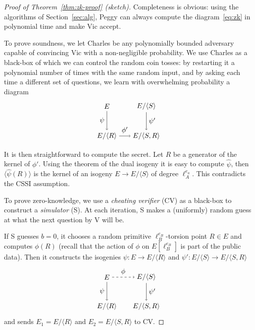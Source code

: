 \documentclass[jmc]{degruyter-journal-a}
\theoremstyle{definition}
\newcommand{\cyc}[1]{{\langle #1 \rangle}}
\begin{document}
\begin{proof}[Proof of Theorem~\ref{thm:zk-proof} (sketch)]
  Completeness is obvious: using the algorithms of
  Section~\ref{sec:alg}, Peggy can always compute the
  diagram~\eqref{eq:zk} in polynomial time and make Vic accept.

  To prove soundness, we let Charles be any polynomially bounded
  adversary capable of convincing Vic with a non-negligible
  probability. We use Charles as a black-box of which we can control
  the random coin tosses: by restarting it a polynomial number of
  times with the same random input, and by asking each time a different
  set of questions, we learn with overwhelming probability a diagram
  \begin{equation}
    \label{eq:zk1-soundness}
    \begin{tikzpicture}[xscale=2,yscale=1.5,baseline=(current bounding box.east)]
      \node(0) at (0,0) {$E$};
      \node(S) at (1,0) {$E/\cyc{S}$};
      \node(R) at (0,-1) {$E/\cyc{R}$};
      \node(SR) at (1,-1) {$E/\cyc{S,R}$};
            \path[->] (0) edge node[auto,swap] {$\psi$} (R);
      \path[->] (S) edge node[auto] {$\psi'$} (SR);
      \path[->] (R) edge node[auto] {$\phi'$} (SR);
    \end{tikzpicture}
  \end{equation}

  It is then straightforward to compute the secret. Let $R$ be a
  generator of the kernel of $\phi'$. Using the theorem of the dual
  isogeny it is easy to compute $\hat{\psi}$, then
  $\cyc{\hat{\psi}(R)}$ is the kernel of an isogeny $E\to E/\cyc{S}$
  of degree $\ell_A^{e_a}$. This contradicts the CSSI assumption.

  To prove zero-knowledge, we use a \emph{cheating verifier} (CV) as a
  black-box to construct a \emph{simulator} (S). At each iteration, S
  makes a (uniformly) random guess at what the next question by V will
  be.

  If S guesses $b=0$, it chooses a random primitive
  $\ell_B^{e_B}$-torsion point $R\in E$ and computes $\phi(R)$ (recall
  that the action of $\phi$ on $E[\ell_B^{e_B}]$ is part of the public
  data). Then it constructs the isogenies $\psi:E\to E/\cyc{R}$ and
  $\psi':E/\cyc{S}\to E/\cyc{S,R}$
  \begin{equation}
    \label{eq:zk2-vertical}
    \begin{tikzpicture}[xscale=2,yscale=1.5,baseline=(current bounding box.east)]
      \node(0) at (0,0) {$E$};
      \node(S) at (1,0) {$E/\cyc{S}$};
      \node(R) at (0,-1) {$E/\cyc{R}$};
      \node(SR) at (1,-1) {$E/\cyc{S,R}$};
      \path[->,dashed] (0) edge node[auto] {$\phi$} (S);
      \path[->] (0) edge node[auto,swap] {$\psi$} (R);
      \path[->] (S) edge node[auto] {$\psi'$} (SR);
    \end{tikzpicture}
  \end{equation}
  and sends $E_1=E/\cyc{R}$ and $E_2=E/\cyc{S,R}$ to CV.
  

\end{proof}
\end{document}
